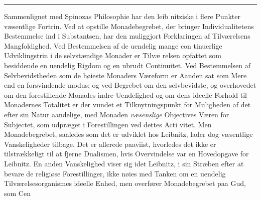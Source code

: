 \documentclass[12pt,a4paper]{book}
\newcommand{\divrule}{\begin{center}\rule{2cm}{0.4pt}\end{center}}
\begin{document}
\divrule

Sammenlignet med Spinozas Philosophie har den leib\-%
nitziske i flere Punkter væsentlige Fortrin. Ved at opstille
Monadebegrebet, der bringer Individualitetens Bestemmelse ind i
Substantsen, har den muliggjort Forklaringen af Tilværelsens
Mangfoldighed. Ved Bestemmelsen af de uendelig mange con\-%
tinuerlige Udviklingstrin i de selvstændige Monader er Tilvæ\-%
relsen opfattet som besiddende en uendelig Rigdom og en ubrudt
Continuitet. Ved Bestemmelsen af Selvbevidstheden som de
høieste Monaders Væreform er Aanden sat som Mere end en
forsvindende modus; og ved Begrebet om den selvbevidste, og
overhovedet om den forestillende Monades indre Uendelighed
og om dens ideelle Forhold til Monadernes Totalitet er der
vundet et Tilknytningspunkt for Muligheden af det efter sin
Natur aandelige, med Monaden \emph{væsenslige} Objectives Væren
for Subjectet, som udpræget i Forestillingen ved dettes Acti\-%
vitet. Men Monadebegrebet, saaledes som det er udviklet hos
Leibnitz, lader dog væsentlige Vanskeligheder tilbage. Det er
allerede paaviist, hvorledes det ikke er tilstrækkeligt til at
fjerne Dualismen, hvis Overvindelse var en Hovedopgave for
Leibnitz. En anden Vanskelighed viser sig idet Leibnitz, i
sin Stræben efter at bevare de religiøse Forestillinger, ikke
nøies med Tanken om en uendelig Tilværelsesorganismes ideelle
Enhed, men overfører Monadebegrebet paa Gud, som Cen\-%
\end{document}
